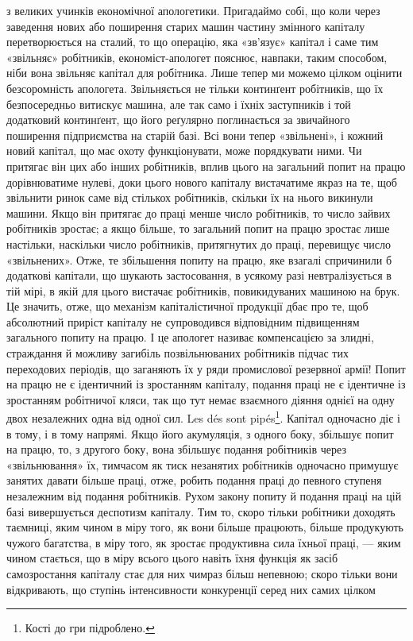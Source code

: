 \parcont{}  %
з великих учинків економічної апологетики. Пригадаймо собі,
що коли через заведення нових або поширення старих машин
частину змінного капіталу перетворюється на сталий, то що
операцію, яка «зв’язує» капітал і саме тим «звільняє» робітників,
економіст-апологет пояснює, навпаки, таким способом,
ніби вона звільняє капітал для робітника. Лише тепер ми можемо
цілком оцінити безсоромність апологета. Звільняється не тільки
континґент робітників, що їх безпосередньо витискує машина,
але так само і їхніх заступників і той додатковий континґент,
що його реґулярно поглинається за звичайного поширення підприємства
на старій базі. Всі вони тепер «звільнені», і кожний
новий капітал, що має охоту функціонувати, може порядкувати
ними. Чи притягає він цих або інших робітників, вплив цього
на загальний попит на працю дорівнюватиме нулеві, доки цього
нового капіталу вистачатиме якраз на те, щоб звільнити ринок
саме від стількох робітників, скільки їх на нього викинули машини.
Якщо він притягає до праці менше число робітників, то
число зайвих робітників зростає; а якщо більше, то загальний
попит на працю зростає лише настільки, наскільки число робітників,
притягнутих до праці, перевищує число «звільнених».
Отже, те збільшення попиту на працю, яке взагалі спричинили б
додаткові капітали, що шукають застосовання, в усякому разі
невтралізується в тій мірі, в якій для цього вистачає робітників,
повикидуваних машиною на брук. Це значить, отже, що механізм
капіталістичної продукції дбає про те, щоб абсолютний приріст
капіталу не супроводився відповідним підвищенням загального
попиту на працю. І це апологет називає компенсацією за злидні,
страждання й можливу загибіль позвільнюваних робітників підчас
тих переходових періодів, що заганяють їх у ряди промислової
резервної армії! Попит на працю не є ідентичний із зростанням
капіталу, подання праці не є ідентичне із зростанням робітничої
кляси, так що тут немає взаємного діяння однієї на одну двох
незалежних одна від одної сил. Les dés sont pipés\footnote*{
Кості до гри підроблено. 
}. Капітал
одночасно діє і в тому, і в тому напрямі. Якщо його акумуляція,
з одного боку, збільшує попит на працю, то, з другого боку,
вона збільшує подання робітників через «звільнювання» їх,
тимчасом як тиск незанятих робітників одночасно примушує
занятих давати більше праці, отже, робить подання праці до
певного ступеня незалежним від подання робітників. Рухом закону
попиту й подання праці на цій базі вивершується деспотизм
капіталу. Тим то, скоро тільки робітники доходять таємниці,
яким чином в міру того, як вони більше працюють, більше продукують
чужого багатства, в міру того, як зростає продуктивна
сила їхньої праці, — яким чином стається, що в міру всього цього
навіть їхня функція як засіб самозростання капіталу стає для
них чимраз більш непевною; скоро тільки вони відкривають,
що ступінь інтенсивности конкуренції серед них самих цілком
\parbreak{}  %
